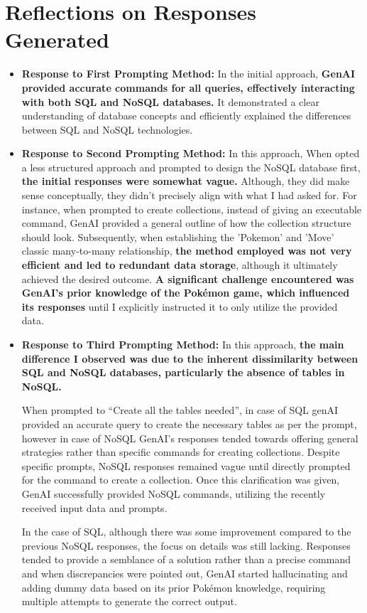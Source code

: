 \documentclass[10pt,onecolumn,letterpaper]{article}
\begin{document}
\section{Reflections on Responses Generated}
\begin{itemize}
    \item \textbf{Response to First Prompting Method:}
	In the initial approach, \textbf{GenAI provided accurate commands for all queries, effectively interacting with both SQL and NoSQL databases.} It demonstrated a clear understanding of database concepts and efficiently explained the differences between SQL and NoSQL technologies.
    
    \item \textbf{Response to Second Prompting Method:}
	In this approach, When opted a less structured approach and prompted to design the NoSQL database first, \textbf{the initial responses were somewhat vague.} Although, they did make sense conceptually, they didn't precisely align with what I had asked for. For instance, when prompted to create collections, instead of giving an executable command, GenAI provided a general outline of how the collection structure should look. Subsequently, when establishing the 'Pokemon' and 'Move' classic many-to-many relationship, \textbf{the method employed was not very efficient and led to redundant data storage}, although it ultimately achieved the desired outcome. \textbf{A significant challenge encountered was GenAI's prior knowledge of the Pokémon game, which influenced its responses} until I explicitly instructed it to only utilize the provided data.

     \item \textbf{Response to Third Prompting Method:}
     In this approach, \textbf{the main difference I observed was due to the inherent dissimilarity between SQL and NoSQL databases, particularly the absence of tables in NoSQL.}
     
     When prompted to “Create all the tables needed”, in case of SQL genAI provided an accurate query to create the necessary tables as per the prompt, however in case of NoSQL GenAI’s responses tended towards offering general strategies rather than specific commands for creating collections. Despite specific prompts, NoSQL responses remained vague until directly prompted for the command to create a collection. Once this clarification was given, GenAI successfully provided NoSQL commands, utilizing the recently received input data and prompts.
     
     In the case of SQL, although there was some improvement compared to the previous NoSQL responses, the focus on details was still lacking. Responses tended to provide a semblance of a solution rather than a precise command and when discrepancies were pointed out, GenAI started hallucinating and adding dummy data based on its prior Pokémon knowledge, requiring multiple attempts to generate the correct output.
\end{itemize}
\end{document}
